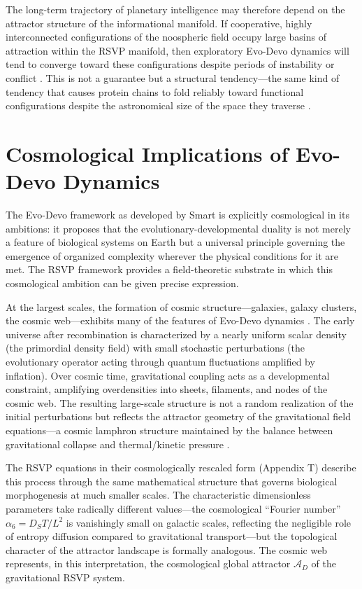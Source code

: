 \documentclass[12pt]{article}
\begin{document}
The long-term trajectory of planetary intelligence may therefore depend on the attractor structure of the informational manifold. If cooperative, highly interconnected configurations of the noospheric field occupy large basins of attraction within the RSVP manifold, then exploratory Evo-Devo dynamics will tend to converge toward these configurations despite periods of instability or conflict \cite{smart2009,smart2023}. This is not a guarantee but a structural tendency---the same kind of tendency that causes protein chains to fold reliably toward functional configurations despite the astronomical size of the space they traverse \cite{kauffman1993}.

\section{Cosmological Implications of Evo-Devo Dynamics}
\label{sec:cosmology}

The Evo-Devo framework as developed by Smart \cite{smart2009,smart2023} is explicitly cosmological in its ambitions: it proposes that the evolutionary-developmental duality is not merely a feature of biological systems on Earth but a universal principle governing the emergence of organized complexity wherever the physical conditions for it are met. The RSVP framework provides a field-theoretic substrate in which this cosmological ambition can be given precise expression.

At the largest scales, the formation of cosmic structure---galaxies, galaxy clusters, the cosmic web---exhibits many of the features of Evo-Devo dynamics \cite{tegmark2014}. The early universe after recombination is characterized by a nearly uniform scalar density (the primordial density field) with small stochastic perturbations (the evolutionary operator acting through quantum fluctuations amplified by inflation). Over cosmic time, gravitational coupling acts as a developmental constraint, amplifying overdensities into sheets, filaments, and nodes of the cosmic web. The resulting large-scale structure is not a random realization of the initial perturbations but reflects the attractor geometry of the gravitational field equations---a cosmic lamphron structure maintained by the balance between gravitational collapse and thermal/kinetic pressure \cite{tegmark2014}.

The RSVP equations in their cosmologically rescaled form (Appendix T) describe this process through the same mathematical structure that governs biological morphogenesis at much smaller scales. The characteristic dimensionless parameters take radically different values---the cosmological ``Fourier number'' $\alpha_6 = D_S T/L^2$ is vanishingly small on galactic scales, reflecting the negligible role of entropy diffusion compared to gravitational transport---but the topological character of the attractor landscape is formally analogous. The cosmic web represents, in this interpretation, the cosmological global attractor $\mathcal{A}_D$ of the gravitational RSVP system.
\end{document}
